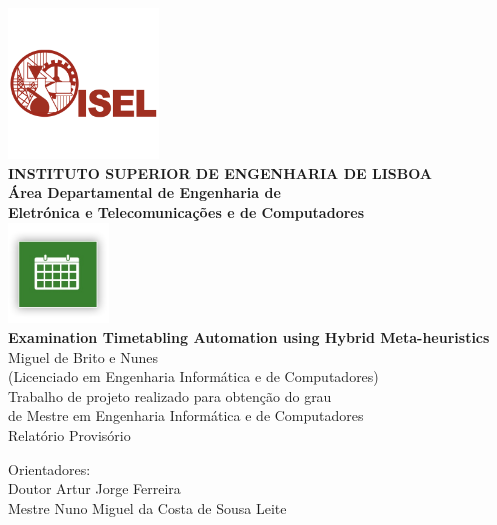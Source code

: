 \begin{titlepage}
	\begin{center}
		\includegraphics[width=0.3\textwidth,natwidth=720,natheight=434]{./images/isellogo.png} \\[0.5cm]
		{\Large \textbf{INSTITUTO SUPERIOR DE ENGENHARIA DE LISBOA}} \\[0.5cm]
		{\Large \textbf{Área Departamental de Engenharia de \\Eletrónica e Telecomunica\c cões e de Computadores}} \\[0.8cm]		
		\includegraphics[width=0.2\textwidth,natwidth=300,natheight=300]{./images/timetable.jpg} \\[0.8cm]
		\fontsize{18pt}{10pt}\selectfont
		{\textbf{Examination Timetabling Automation using Hybrid Meta-heuristics}} \\[0.8cm]
		\fontsize{16pt}{10pt}\selectfont
		Miguel de Brito e Nunes\\[0.2cm]
		\fontsize{14pt}{10pt}\selectfont
		(Licenciado em Engenharia Informática e de Computadores)\\[0.8cm]
		\fontsize{12pt}{10pt}\selectfont
		{Trabalho de projeto realizado para obten\c cão do grau\\de Mestre em Engenharia Informática e de Computadores} \\[0.8cm]
		\fontsize{16pt}{10pt}\selectfont
		Relatório Provisório
		\vfill
		\begin{tabbing}
		   \fontsize{12pt}{10pt}\selectfont
		   Orientadores: \\
		   \fontsize{11pt}{10pt}\selectfont
		   \hspace{1.1cm}Doutor Artur Jorge Ferreira \\
		   \fontsize{11pt}{10pt}\selectfont
		   \hspace{1.1cm}Mestre Nuno Miguel da Costa de Sousa Leite \\

\end{tabbing}
\end{center}
\end{titlepage}
